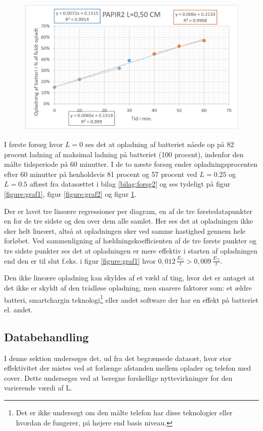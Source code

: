 \begin{figure}[H]
\centering
\includegraphics[width=1\textwidth]{Setup/forsg2_graf3}
\caption{}
\label{figure:graf3}
\end{figure}

I første forsøg hvor $L = 0$ ses det at opladning af batteriet nåede op på 82 procent ladning af maksimal ladning på batteriet (100 procent), indenfor den målte tidsperiode på 60 minutter. I de to næste forsøg ender opladningsprocenten efter 60 minutter på henholdsvis 81 procent og 57 procent ved $L = 0.25$ og $L = 0.5$ aflæst fra datasættet i bilag \ref{bilag:forsg2} og ses tydeligt på figur \ref{figure:graf1}, figur \ref{figure:graf2} og figur \ref{figure:graf3}.

Der er lavet tre lineære regressioner per diagram, en af de tre førstedatapunkter en for de tre sidste og den over dem alle samlet. Her ses det at opladningen ikke sker helt lineært, altså at opladningen sker ved samme hastighed gennem hele forløbet. Ved sammenligning af hældningskoefficienten af de tre første punkter og tre sidste punkter ses det at opladningen er mere effektiv i starten af opladningen end den er til slut f.eks. i figur \ref{figure:graf1} hvor $0,012\, \frac{E_\%}{t} > 0,009\, \frac{E_\%}{t}$.

Den ikke lineære opladning kan skyldes af et væld af ting, hvor det er antaget at det ikke er skyldt af den trådløse opladning, men snarere faktorer som: et ældre batteri, smartchargin teknologi\footnote{Det er ikke undersøgt om den målte telefon har disse teknologier eller hvordan de fungerer, på højere end basis niveau.} eller andet software der har en effekt på batteriet el. andet. 

\subsection{Databehandling}
I denne sektion undersøges det, ud fra det begrænsede datasæt, hvor stor effektivitet der mistes ved at forlænge afstanden mellem oplader og telefon med cover. Dette undersøges ved at beregne forskellige nyttevirkninger for den varierende værdi af L. 

